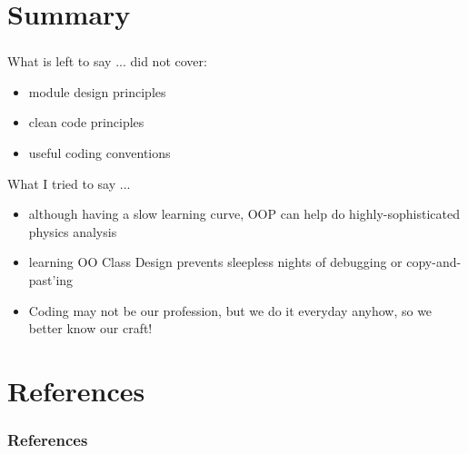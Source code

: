 \documentclass[9pt]{beamer}
\begin{document}
\section{Summary}
\begin{frame}
  \frametitle{\secname}
  \begin{block}{What is left to say ...}
    did not cover:
    \begin{itemize}
    \item module design principles
    \item clean code principles
    \item useful coding conventions
    \end{itemize}
  \end{block}
\vfill
\pause
  \begin{block}{What I tried to say ...}
    \begin{itemize}
    \item although having a slow learning curve, OOP can help do highly-sophisticated physics analysis
    \item learning OO Class Design prevents sleepless nights of debugging or copy-and-past'ing
    \item Coding may not be our profession, but we do it everyday anyhow, so we better know our craft!
    \end{itemize}
  \end{block}
\end{frame}

\section{References}
\scriptsize
\begin{frame}
  \frametitle{References}
   
  
\end{frame}
\end{document}
